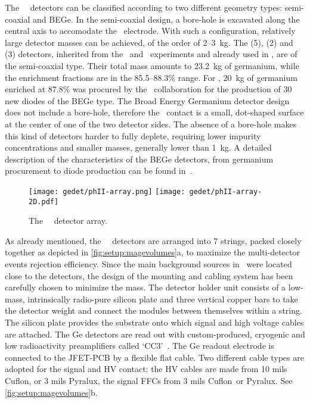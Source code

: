 The \gerda\ \phasetwo\ detectors can be classified according to two different geometry
types: semi-coaxial and BEGe. In the semi-coaxial design, a bore-hole is excavated along
the central axis to accomodate the \pplus\ electrode. With such a configuration,
relatively large detector masses can be achieved, of the order of 2--3~kg. The \ANG{} (5),
\RG{} (2) and \GTF{} (3) detectors, inherited from the \hdm\ and \igex\ experiments and
already used in \phaseone, are of the semi-coaxial type. Their total mass amounts to
23.2~kg of germanium, while the enrichment fractions are in the 85.5--88.3\% range. For
\phasetwo, 20~kg of germanium enriched at 87.8\% was procured by the \gerda\ collaboration
for the production of 30 new diodes of the BEGe type. The Broad Energy Germanium detector
design does not include a bore-hole, therefore the \pplus\ contact is a small, dot-shaped
surface at the center of one of the two detector sides. The absence of a bore-hole makes
this kind of detectors harder to fully deplete, requiring lower impurity concentrations
and smaller masses, generally lower than 1~kg. A detailed description of the
characteristics of the BEGe detectors, from germanium procurement to diode production can
be found in~\cite{Agostini2015e, Agostini2018a, Agostini2019}.

\begin{figure}
  \centering
  \texttt{[image: gedet/phII-array.png]}
  \hspace{0.5cm}
  \texttt{[image: gedet/phII-array-2D.pdf]}
  \caption{%
    The \gerda\ \phasetwo\ detector array.
  }\label{fig:setup:array}
\end{figure}

As already mentioned, the \gerda\ \phasetwo\ detectors are arranged into 7 strings, packed
closely together as depicted in \cref{fig:setup:magevolumes}a, to maximize the
multi-detector events rejection efficiency. Since the main background sources in
\phaseone\ were located close to the detectors, the design of the mounting and cabling
system has been carefully chosen to minimize the mass. The detector holder unit consists
of a low-mass, intrinsically radio-pure silicon plate and three vertical copper bars to
take the detector weight and connect the modules between themselves within a string. The
silicon plate provides the substrate onto which signal and high voltage cables are
attached. The Ge detectors are read out with custom-produced, cryogenic and low
radioactivity preamplifiers called `CC3'~\cite{Riboldi2015}. The Ge readout electrode is
connected to the JFET-PCB by a flexible flat cable. Two different cable types are adopted
for the signal and HV contact: the HV cables are made from 10 mils Cuflon\reg, or 3 mils
Pyralux\reg, the signal FFCs from 3 mils Cuflon\reg\ or Pyralux\reg. See
\cref{fig:setup:magevolumes}b.

